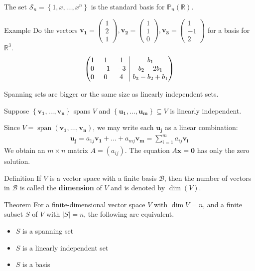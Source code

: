 \documentclass{report}
\makeatletter
\renewcommand{\vec}{\mathbf}
\newcommand{\Span}{\operatorname{span}}
\newenvironment{amatrix}[1]{%
  \left(\begin{array}{@{}*{#1}{c}|c@{}}
}{%
  \end{array}\right)
}
\newcommand{\cvec}[1]{ \begin{pmatrix} #1 \end{pmatrix} }
\makeatother
\begin{document}
\begin{enumerate}
		The set $\mathcal{S}_n = \left\{ 1, x, \dots, x^n \right\}$ is the standard basis for $\mathbb{P}_n(\mathbb{R})$.

		\begin{question}{Example}
			Do the vectors $\vec{v_1} = \cvec{1\\2\\1}, \vec{v_2} = \cvec{1\\1\\0}, \vec{v_3} = \cvec{1\\-1\\2}$ for a basis for $\mathbb{R}^3$.
			\begin{align*}
				\begin{amatrix}{3}
					1 & 1 & 1 & b_1	\\
					0 & -1 & -3 & b_2 - 2b_1	\\
					0 & 0 & 4 & b_3 - b_2 + b_1
				\end{amatrix}
			\end{align*}
		\end{question}

		Spanning sets are bigger or the same size as linearly independent sets.

		Suppose $\left\{\vec{v_1}, \dots, \vec{v_n}\right\}$ spans $V$ and $\left\{\vec{u_1}, \dots, \vec{u_m}\right\} \subseteq V$ is linearly independent.

		Since $V = \Span(\vec{v_1, \dots, \vec{v_n}})$, we may write each $\vec{u_j}$ as a linear combination:
		\begin{align*}
			\vec{u_j} = a_{1j}\vec{v_1} + \dots + a_{mj}\vec{v_m} = \sum_{i=1}^m a_{ij} \vec{v_i}
		\end{align*}
		We obtain an $m \times n$ matrix $A = (a_{ij})$. The equation $A\vec{x} = \vec{0}$ has only the zero solution.
		
		\begin{question}{Definition}
			If $V$ is a vector space with a finite basis $\mathcal{B}$, then the number of vectors in $\mathcal{B}$ is called the \textbf{dimension} of $V$ and is denoted by $\operatorname{dim}(V)$.
		\end{question}

		\begin{question}{Theorem}
			For a finite-dimensional vector space $V$ with $\operatorname{dim} V = n$, and a finite subset $S$ of $V$ with $|S| = n$, the following are equivalent.
			\begin{itemize}
				\item $S$ is a spanning set
				\item $S$ is a linearly independent set
				\item $S$ is a basis
			\end{itemize}
		\end{question}


\end{enumerate}
\end{document}
